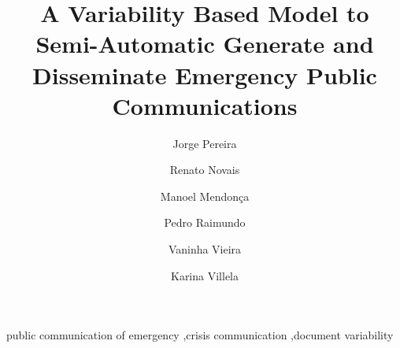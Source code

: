 \documentclass[final,3p,times,twocolumn]{elsarticle}
\begin{document}
\begin{frontmatter}

\title {A Variability Based Model to Semi-Automatic Generate and Disseminate Emergency Public Communications}


\author[label1]{Jorge Pereira}
\address[label1]{Federal University of Bahia (UFBA), Department of Computer Science, Brazil}




\author[label2]{Renato Novais}
\address[label2]{Federal Institute of Bahia (IFBA), Computer Department, Brazil}

\author[label1, label3]{Manoel Mendon\c{c}a}
\address[label3]{Fraunhofer Project Center at UFBA, Brazil}

\author[label1]{Pedro Raimundo}

\author[label1]{Vaninha Vieira}

\author[label4]{Karina Villela}
\address[label4]{Fraunhofer Institute for Experimental Software Engineering (IESE), Germany}



\begin{keyword}
public communication of emergency \sep crisis communication \sep document variability
\end{keyword}

\end{frontmatter}












\end{document}
